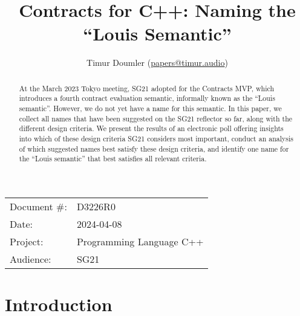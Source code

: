 

 \usepackage[bottom]{footmisc} 
 
 \usepackage{longtable}



\title{Contracts for C++: Naming the ``Louis Semantic''}
\author{ Timur Doumler \small(\href{mailto:papers@timur.audio}{papers@timur.audio}) 
}
\date{}
\maketitle

\begin{tabular}{ll}
Document \#: & D3226R0 \\
Date: &2024-04-08 \\
Project: & Programming Language C++ \\
Audience: & SG21
\end{tabular}

\begin{abstract}
At the March 2023 Tokyo meeting, SG21 adopted \cite{P3191R0} for the Contracts MVP, which introduces a fourth contract evaluation semantic, informally known as the ``Louis semantic''. However, we do not yet have a name for this semantic. In this paper, we collect all names that have been suggested on the SG21 reflector so far, along with the different design criteria. We present the results of an electronic poll offering insights into which of these design criteria SG21 considers most important, conduct an analysis of which suggested names best satisfy these design criteria, and identify one name for the ``Louis semantic'' that best satisfies all relevant criteria.
\end{abstract}


\section{Introduction}
\label{sec:intro}

